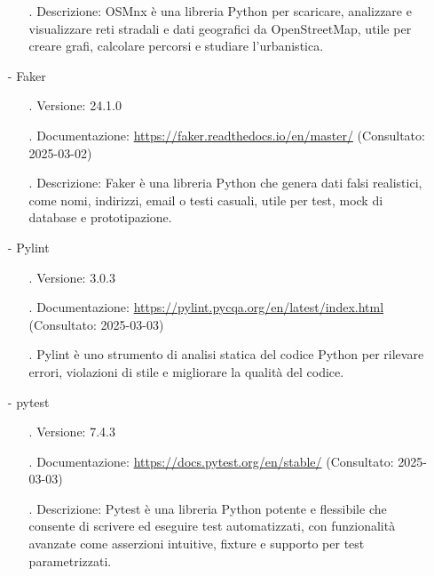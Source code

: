 \documentclass[10pt]{article}
\begin{document}
\begin{justify}
\begin{itemize}
\begin{itemize}
                        \item[.] Descrizione: OSMnx è una libreria Python per scaricare, analizzare e visualizzare reti stradali e dati geografici da OpenStreetMap, 
                        utile per creare grafi, calcolare percorsi e studiare l’urbanistica.
                    \end{itemize}
                \item[-] Faker
                    \begin{itemize}
                        \item[.] Versione: 24.1.0
                        \item[.] Documentazione: \textcolor{blue}{\url{https://faker.readthedocs.io/en/master/}} (Consultato: 2025-03-02)
                        \item[.] Descrizione: Faker è una libreria Python che genera dati falsi realistici, come nomi, indirizzi, email o testi casuali, utile per test, 
                        mock di database e prototipazione.
                    \end{itemize}
                \item[-] Pylint
                    \begin{itemize}
                        \item[.] Versione: 3.0.3
                        \item[.] Documentazione: \textcolor{blue}{\url{https://pylint.pycqa.org/en/latest/index.html}} (Consultato: 2025-03-03)
                        \item[.] Pylint è uno strumento di analisi statica del codice Python per rilevare errori, violazioni di stile e migliorare la qualità del codice.
                    \end{itemize}
                \item[-] pytest
                    \begin{itemize}
                        \item[.] Versione: 7.4.3
                        \item[.] Documentazione: \textcolor{blue}{\url{https://docs.pytest.org/en/stable/}} (Consultato: 2025-03-03)
                        \item[.] Descrizione: Pytest è una libreria Python potente e flessibile che consente di scrivere ed eseguire test automatizzati, con funzionalità avanzate come 
                        asserzioni intuitive, fixture e supporto per test parametrizzati.
                    \end{itemize}
            \end{itemize}


\end{justify}
\end{document}
